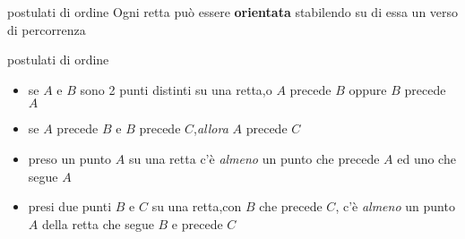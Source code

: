 \documentclass{beamer}
\begin{document}
\begin{frame}{postulati di ordine}
    Ogni retta può essere \textbf{orientata} stabilendo su di essa un verso di percorrenza
    \begin{center}
    \end{center}
    \begin{block}{postulati di ordine}
    \begin{itemize}
        \item se $A$ e $B$ sono 2 punti distinti su una retta,o $A$ precede $B$ oppure $B$ precede $A$
        \item se $A$ precede $B$ e $B$ precede $C$,\emph{allora} $A$ precede $C$  
        \item preso un punto $A$ su una retta c'è \emph{almeno} un punto che precede $A$ ed uno che segue $A$
        \item presi due punti $B$ e $C$ su una retta,con $B$ che precede $C$, c'è \emph{almeno} un punto $A$ della retta che segue $B$ e precede $C$
    \end{itemize}
       \end{block}
\end{frame}
\end{document}
